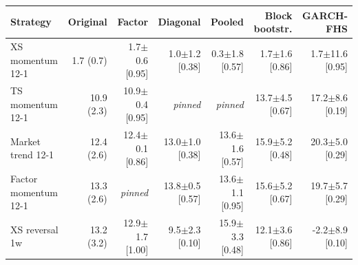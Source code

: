 \begin{tabular}{lrrrrrr}
\toprule
Strategy & Original & Factor & Diagonal & Pooled & Block bootstr. & GARCH-FHS \\
\midrule
XS momentum 12-1 & 1.7 (0.7) & 1.7$\pm$0.6 [0.95] & 1.0$\pm$1.2 [0.38] & 0.3$\pm$1.8 [0.57] & 1.7$\pm$1.6 [0.86] & 1.7$\pm$11.6 [0.95] \\
TS momentum 12-1 & 10.9 (2.3) & 10.9$\pm$0.4 [0.95] & \emph{pinned} & \emph{pinned} & 13.7$\pm$4.5 [0.67] & 17.2$\pm$8.6 [0.19] \\
Market trend 12-1 & 12.4 (2.6) & 12.4$\pm$0.1 [0.86] & 13.0$\pm$1.0 [0.38] & 13.6$\pm$1.6 [0.57] & 15.9$\pm$5.2 [0.48] & 20.3$\pm$5.0 [0.29] \\
Factor momentum 12-1 & 13.3 (2.6) & \emph{pinned} & 13.8$\pm$0.5 [0.57] & 13.6$\pm$1.1 [0.95] & 15.6$\pm$5.2 [0.67] & 19.7$\pm$5.7 [0.29] \\
XS reversal 1w & 13.2 (3.2) & 12.9$\pm$1.7 [1.00] & 9.5$\pm$2.3 [0.10] & 15.9$\pm$3.3 [0.48] & 12.1$\pm$3.6 [0.86] & -2.2$\pm$8.9 [0.10] \\
\bottomrule
\end{tabular}